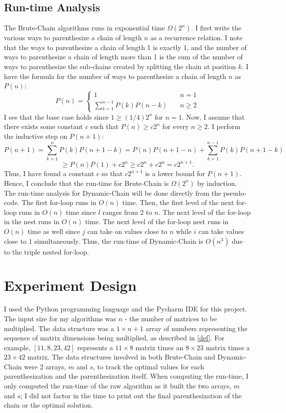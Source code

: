 \documentclass[letterpaper,titlepage]{article}
\begin{document}
\subsection{Run-time Analysis}
The Brute-Chain algorithms runs in exponential time $\Omega(2^n)$. I first write the various ways to parenthesize a chain of length $n$ as a recurrence relation. I note that the ways to parenthesize a chain of length 1 is exactly 1, and the number of ways to parenthesize a chain of length more than 1 is the sum of the number of ways to parenthesize the sub-chains created by splitting the chain at position $k$. I have the formula for the number of ways to parenthesize a chain of length $n$ as $P(n)$:
\begin{equation*}
P(n) = \left\{
        \begin{array}{ll}
           1 & \quad n=1 \\
            \sum_{k=1}^{n-1} P(k)P(n-k) & \quad n \geq 2
        \end{array}
    \right.
\end{equation*}
I see that the base case holds since $1 \geq (1/4)2^n$ for $n=1.$ Now, I assume that there exists some constant $c$ such that $P(n) \geq c2^n$ for every $n \geq 2$. I perform the inductive step on $P(n+1)$:
$$P(n+1) = \sum_{k=1}^{n} P(k)P(n+1-k) =P(n)P(n+1-n)+\sum_{k=1}^{n-1} P(k)P(n+1-k) $$
$$\geq P(n)P(1)+c2^n \geq c2^n+c2^n = c2^{n+1}.$$
Thus, I have found a constant $c$ so that $c2^{n+1}$ is a lower bound for $P(n+1)$. Hence, I conclude that the run-time for Brute-Chain is $\Omega(2^n)$ by induction.
\newline
The run-time analysis for Dynamic-Chain will be done directly from the pseudo-code. The first for-loop runs in $O(n)$ time. Then, the first level of the next for-loop runs in $O(n)$ time since $l$ ranges from 2 to $n$. The next level of the for-loop in the nest runs in $O(n)$ time. The next level of the for-loop nest runs in $O(n)$ time as well since $j$ can take on values close to $n$ while $i$ can take values close to $1$ simultaneously. Thus, the run-time of Dynamic-Chain is $O(n^3)$ due to the triple nested for-loop.

\section{Experiment Design}
I used the Python programming language and the Pycharm IDE for this project. The input size for my algorithms was $n$ - the number of matrices to be multiplied.
The data structure was a $1 \times n+1$ array of numbers representing the sequence of matrix dimensions being multiplied, as described in \ref{def}. For example, $[11,8,23,42]$ represents a $11\times 8$ matrix times an $8 \times 23$ matrix times a $23 \times 42$ matrix. The data structures involved in both Brute-Chain and Dynamic-Chain were 2 arrays, $m$ and $s$, to track the optimal values for each parenthesization and the parenthesization itself. When computing the run-time, I only computed the run-time of the raw algorithm as it built the two arrays, $m$ and $s$; I did not factor in the time to print out the final parenthesization of the chain or the optimal solution.
\end{document}
